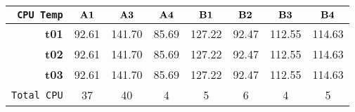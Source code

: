 \begin{tabular}{r|ccccccc}\cline{2-8}
\tt CPU Temp&$\bf A1$&$\bf A3$&$\bf A4$&$\bf B1$&$\bf B2$&$\bf B3$&$\bf B4$\\\hline
\bf t01& 92.61& 141.70& 85.69& 127.22& 92.47& 112.55& 114.63\\
\bf t02& 92.61& 141.70& 85.69& 127.22& 92.47& 112.55& 114.63\\
\bf t03& 92.61& 141.70& 85.69& 127.22& 92.47& 112.55& 114.63\\
\hline
\tt Total CPU& 37& 40& 4& 5& 6& 4& 5\\
\end{tabular}
